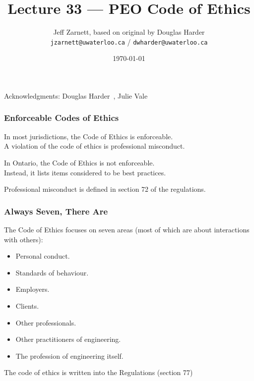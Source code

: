 

\title{Lecture 33 --- PEO Code of Ethics }

\author{Jeff Zarnett, based on original by Douglas Harder \\ \small \texttt{jzarnett@uwaterloo.ca} / \texttt{dwharder@uwaterloo.ca}}
\date{\today}




\begin{frame}
  \titlepage

\begin{center}
  \small{Acknowledgments: Douglas Harder~\cite{dwh}, Julie Vale~\cite{jv}}
  \end{center}
\end{frame}



\begin{frame}
\frametitle{Enforceable Codes of Ethics}


In most jurisdictions, the Code of Ethics is enforceable.\\
\quad A violation of the code of ethics is professional misconduct.


In Ontario, the Code of Ethics is not enforceable.\\
\quad Instead, it lists items considered to be best practices.

Professional misconduct is defined in section 72 of the regulations.

\end{frame}




\begin{frame}
\frametitle{Always Seven, There Are}

The Code of Ethics focuses on seven areas (most of which are about interactions with others):

\begin{itemize}
	\item Personal conduct.
	\item Standards of behaviour.
	\item Employers.
	\item Clients.
	\item Other professionals.
	\item Other practitioners of engineering.
	\item The profession of engineering itself.
\end{itemize}

The code of ethics is written into the Regulations (section 77)

\end{frame}



